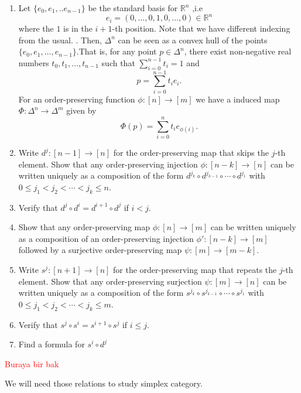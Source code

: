 \documentclass[11pt]{article}
\theoremstyle{definition}
\theoremstyle{plain}
\begin{document}
\begin{enumerate}[label=(\alph*)]
    \item Let $ \{e_0,e_1,..e_{n-1}\} $ be the standard basis for $\mathbb{R}^{n}$ ,i.e
          \[
              e_i = (0, \ldots, 0, 1, 0, \ldots, 0) \in \mathbb{R}^{n}
          \] where the $1$ is in the $i+1$-th position. Note that we have different indexing from the usual.
          . Then, $\Delta^n$ can be seen as a convex hull of the points $\{e_0,e_1,\ldots,e_{n-1} \}$.That is, for any point $p \in \Delta^n$, there exist non-negative real numbers $t_0,t_1,\ldots,t_{n-1}$ such that $\sum_{i=0}^{n-1} t_i = 1$ and
          \[
              p = \sum_{i=0}^{n-1} t_i e_i.
          \]
          For an order-preserving function $\phi : [n] \to [m]$ we have a induced map  $\Phi : \Delta^n \to \Delta^m$  given by
          \[
              \Phi(p) = \sum_{i=0}^{n} t_i e_{\phi(i)}.
          \]


    \item Write $d^j : [n-1] \to [n] $ for the order-preserving map that skips the $j$-th element. Show that any order-preserving injection $\phi : [n-k] \to [n]$ can be written uniquely as a composition of the form $d^{j_k} \circ d^{j_{k-1}} \circ \cdots \circ d^{j_1}$ with $ 0 \leq j_1 < j_2 < \cdots < j_k \leq n$.
    \item Verify that $d^j \circ d^i = d^{i+1} \circ d^j$ if $i < j$.
    \item Show that any order-preserving map $\phi : [n] \to [m]$ can be written uniquely as a composition of an order-preserving injection $\phi' : [n-k] \to [m]$ followed by a surjective order-preserving map $\psi : [m] \to [m-k]$.
    \item Write $s^j : [n+1] \to [n]$ for the order-preserving map that repeats the $j$-th element. Show that any order-preserving surjection $\psi : [m] \to [n]$ can be written uniquely as a composition of the form $s^{j_k} \circ s^{j_{k-1}} \circ \cdots \circ s^{j_1}$ with $ 0 \leq j_1 < j_2 < \cdots < j_k \leq m$.
    \item Verify that $s^j \circ s^i = s^{i+1} \circ s^j$ if $i \leq j$.
    \item Find a formula for $s^i \circ d^j $
\end{enumerate}



\textcolor{red}{Buraya bir bak}


We will need those relations to study simplex category.
\end{document}
